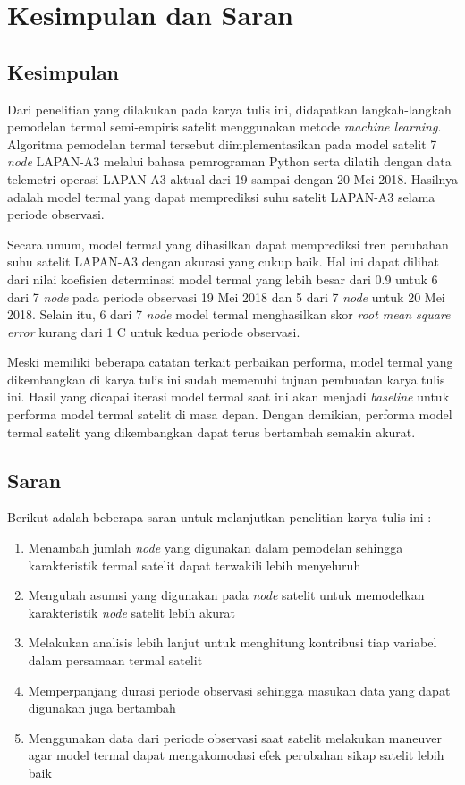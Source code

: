 \chapter{Kesimpulan dan Saran}

\section{Kesimpulan}

Dari penelitian yang dilakukan pada karya tulis ini, didapatkan langkah-langkah
pemodelan termal semi-empiris satelit menggunakan metode \textit{machine learning}.
Algoritma pemodelan termal tersebut diimplementasikan pada model satelit 7 \textit{node}
LAPAN-A3 melalui bahasa pemrograman Python serta dilatih dengan data telemetri
operasi LAPAN-A3 aktual dari 19 sampai dengan 20 Mei 2018. Hasilnya adalah model
termal yang dapat memprediksi suhu satelit LAPAN-A3 selama periode
observasi.

Secara umum, model termal yang dihasilkan dapat memprediksi tren perubahan suhu satelit LAPAN-A3 dengan akurasi yang cukup baik. Hal ini dapat
dilihat dari nilai koefisien determinasi model termal yang lebih besar dari 0.9
untuk 6 dari 7 \textit{node} pada periode observasi 19 Mei 2018 dan 5 dari 7 \textit{node} untuk
20 Mei 2018. Selain itu, 6 dari 7 \textit{node} model termal menghasilkan skor
\textit{root mean square error} kurang dari 1 \degree C untuk kedua periode observasi. 

Meski memiliki beberapa catatan terkait perbaikan performa, model termal yang
dikembangkan di karya tulis ini sudah memenuhi tujuan pembuatan karya tulis
ini. Hasil yang dicapai iterasi model termal saat ini akan menjadi
\textit{baseline} untuk performa model termal satelit di masa depan. Dengan
demikian, performa model termal satelit yang dikembangkan dapat terus bertambah
semakin akurat.

\section{Saran}

Berikut adalah beberapa saran untuk melanjutkan penelitian karya tulis ini :

\begin{enumerate}
\item Menambah jumlah \textit{node} yang digunakan dalam pemodelan sehingga karakteristik termal satelit dapat terwakili lebih menyeluruh
\item Mengubah asumsi yang digunakan pada \textit{node} satelit untuk memodelkan karakteristik \textit{node} satelit lebih akurat
\item Melakukan analisis lebih lanjut untuk menghitung kontribusi tiap variabel dalam persamaan termal satelit
\item Memperpanjang durasi periode observasi sehingga masukan data yang dapat digunakan juga bertambah
\item Menggunakan data dari periode observasi saat satelit melakukan maneuver agar model termal dapat mengakomodasi efek perubahan sikap satelit lebih baik
\end{enumerate}
